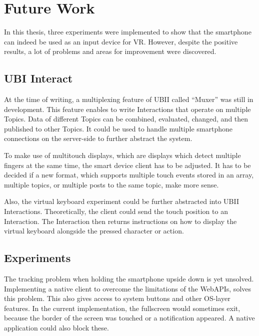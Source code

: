 \chapter{Future Work}\label{chapter:future-work}

In this thesis, three experiments were implemented to show that the smartphone can indeed be used as an input device for \gls{VR}. However, despite the positive results, a lot of problems and areas for improvement were discovered. %


\section{UBI Interact}\label{section:fw-ubii}

At the time of writing, a multiplexing feature of \gls{UBII} called \enquote{Muxer} was still in development. This feature enables to write Interactions that operate on multiple Topics. Data of different Topics can be combined, evaluated, changed, and then published to other Topics. It could be used to handle multiple smartphone connections on the server-side to further abstract the system.

To make use of multitouch displays, which are displays which detect multiple fingers at the same time, the smart device client has to be adjusted. It has to be decided if a new format, which supports multiple touch events stored in an array, multiple topics, or multiple posts to the same topic, make more sense.

Also, the virtual keyboard experiment could be further abstracted into \gls{UBII} Interactions. Theoretically, the client could send the touch position to an Interaction. The Interaction then returns instructions on how to display the virtual keyboard alongside the pressed character or action.


\section{Experiments}\label{section:fw-experiments}

The tracking problem when holding the smartphone upside down is yet unsolved. Implementing a native client to overcome the limitations of the Web\glspl{API}, solves this problem. This also gives access to system buttons and other \gls{OS}-layer features. In the current implementation, the fullscreen would sometimes exit, because the border of the screen was touched or a notification appeared. A native application could also block these.

